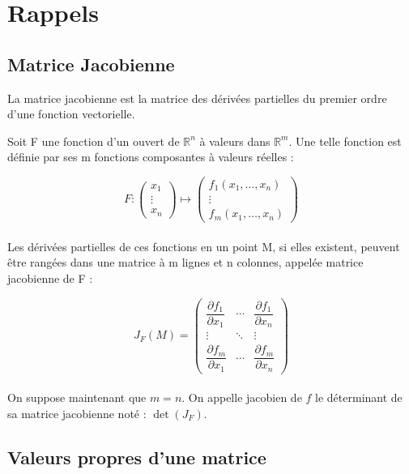 \chapter{Rappels}

\section{Matrice Jacobienne}

La matrice jacobienne est la matrice des dérivées partielles du premier ordre d'une fonction vectorielle.

Soit F une fonction d'un ouvert de $\mathbb{R}^n$ à valeurs dans $\mathbb{R}^m$. Une telle fonction est définie par ses m fonctions composantes à valeurs réelles :

\begin{equation*}
F : \begin{pmatrix}x_1\\\vdots\\x_n\end{pmatrix} \longmapsto \begin{pmatrix}
f_1(x_1,\dots,x_n)\\
\vdots\\
f_m(x_1,\dots,x_n)\end{pmatrix}
\end{equation*}
\\

Les dérivées partielles de ces fonctions en un point M, si elles existent, peuvent être rangées dans une matrice à m lignes et n colonnes, appelée matrice jacobienne de F :

\begin{equation*}
J_F\left(M\right)=
\begin{pmatrix} 
\dfrac{\partial f_1}{\partial x_1} & \cdots & \dfrac{\partial f_1}{\partial x_n} \\
\vdots & \ddots & \vdots \\
\dfrac{\partial f_m}{\partial x_1} & \cdots & \dfrac{\partial f_m}{\partial x_n}
\end{pmatrix}
\end{equation*}
\\

On suppose maintenant que $m = n$. On appelle jacobien de $f$ le déterminant de sa matrice jacobienne noté : $\det( J_F )$.



\section{Valeurs propres d'une matrice}

